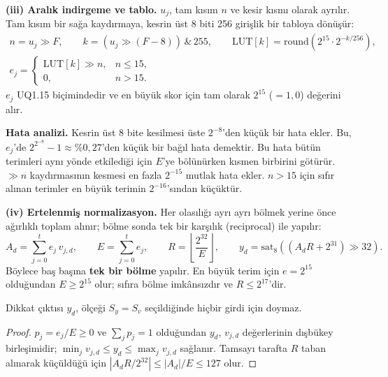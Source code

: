 \textbf{(iii) Aralık indirgeme ve tablo.} $u_j$, tam kısım $n$ ve kesir kısmı olarak ayrılır. Tam kısım bir sağa kaydırmaya, kesrin üst 8 biti 256 girişlik bir tabloya dönüşür:
\begin{equation}
\begin{gathered}
  n = u_j \gg F, \qquad k = (u_j \gg (F-8)) \,\&\, 255, \qquad \mathrm{LUT}[k] = \mathrm{round}\left(2^{15} \cdot 2^{-k/256}\right), \\
  e_j = \begin{cases} \mathrm{LUT}[k] \gg n, & n \le 15, \\ 0, & n > 15. \end{cases}
\end{gathered}
\end{equation}
$e_j$ UQ1.15 biçimindedir ve en büyük skor için tam olarak $2^{15}$ ($=1{,}0$) değerini alır.

\textbf{Hata analizi.} Kesrin üst 8 bite kesilmesi üste $2^{-8}$'den küçük bir hata ekler. Bu, $e_j$'de $2^{2^{-8}}-1 \approx \%0{,}27$'den küçük bir bağıl hata demektir. Bu hata bütün terimleri aynı yönde etkilediği için $E$'ye bölünürken kısmen birbirini götürür. $\gg n$ kaydırmasının kesmesi en fazla $2^{-15}$ mutlak hata ekler. $n>15$ için sıfır alınan terimler en büyük terimin $2^{-16}$'sından küçüktür.

\textbf{(iv) Ertelenmiş normalizasyon.} Her olasılığı ayrı ayrı bölmek yerine önce ağırlıklı toplam alınır; bölme sonda tek bir karşılık (reciprocal) ile yapılır:
\begin{equation}
  A_d = \sum_{j=0}^{t} e_j\, v_{j,d}, \qquad E = \sum_{j=0}^{t} e_j, \qquad R = \left\lfloor \frac{2^{32}}{E} \right\rfloor, \qquad y_d = \mathrm{sat}_8\left( \left(A_d R + 2^{31}\right) \gg 32 \right).
\end{equation}
Böylece baş başına \textbf{tek bir bölme} yapılır. En büyük terim için $e = 2^{15}$ olduğundan $E \ge 2^{15}$ olur; sıfıra bölme imkânsızdır ve $R \le 2^{17}$'dir.

\begin{onerme}\label{on:disbukey}
Dikkat çıktısı $y_d$, ölçeği $S_y = S_v$ seçildiğinde hiçbir girdi için doymaz.
\end{onerme}
\begin{proof}
$p_j = e_j/E \ge 0$ ve $\sum_j p_j = 1$ olduğundan $y_d$, $v_{j,d}$ değerlerinin dışbükey birleşimidir; $\min_j v_{j,d} \le y_d \le \max_j v_{j,d}$ sağlanır. Tamsayı tarafta $R$ taban alınarak küçüldüğü için $|A_d R/2^{32}| \le |A_d|/E \le 127$ olur.
\end{proof}

